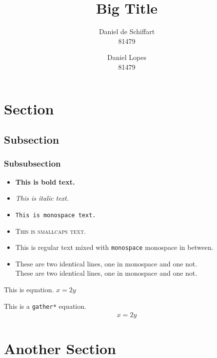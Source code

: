 \documentclass[english,palatino,purist]{ist-report}
\begin{document}
\title{Big Title}
\author{Daniel de Schiffart \\ 81479 \and Daniel Lopes \\ 81479}
\makecover

\section{Section}

\lipsum[1]

\subsection{Subsection}

\lipsum[1-2]

\subsubsection{Subsubsection}

\begin{itemize}
	\item \textbf{This is bold text.}
	\item \textit{This is italic text.}
	\item \texttt{This is monospace text.}
	\item \textsc{This is smallcaps text.}
	\item This is regular text mixed with \texttt{monospace} monospace in between.
	\item These are two identical lines, one in monospace and one not. \\ {\ttfamily These are two identical lines, one in monospace and one not.}
\end{itemize}

This is equation. $x = 2y$

This is a \texttt{gather*} equation.
\begin{gather*}
	x = 2y
\end{gather*}

\section{Another Section}

\lipsum[1-3]
\end{document}
